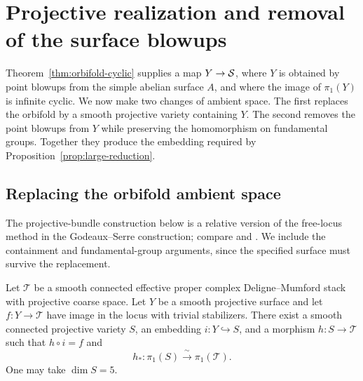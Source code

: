 \section{Projective realization and removal of the surface blowups}
\label{sec:projective}

Theorem~\ref{thm:orbifold-cyclic} supplies a map $Y\to\mathcal S$, where $Y$
is obtained by point blowups from the simple abelian surface $A$, and
where the image of $\pi_1(Y)$ is infinite cyclic.  We now make two changes
of ambient space.  The first replaces the orbifold by a smooth projective
variety containing $Y$.  The second removes the point blowups from $Y$
while preserving the homomorphism on fundamental groups.  Together they
produce the embedding required by Proposition~\ref{prop:large-reduction}.

\subsection{Replacing the orbifold ambient space}

The projective-bundle construction below is a relative version of the
free-locus method in the Godeaux--Serre construction; compare
\cite[\S20]{Serre1958} and \cite[Remark~1.4 and \S5]{Totaro1999}.
We include the containment and fundamental-group arguments, since the
specified surface must survive the replacement.

\begin{lemma}\label{lem:ambient-realization}
Let $\mathcal T$ be a smooth connected effective proper complex
Deligne--Mumford stack with projective coarse space.  Let $Y$ be a smooth
projective surface and let $f:Y\to\mathcal T$ have image in the locus
with trivial stabilizers.  There exist a smooth connected projective
variety $S$, an embedding $i:Y\hookrightarrow S$, and a morphism
$h:S\to\mathcal T$ such that $h\circ i=f$ and
\[
 h_*:\pi_1(S)\xrightarrow{\ \sim\ }\pi_1(\mathcal T).
\]
One may take $\dim S=5$.
\end{lemma}

